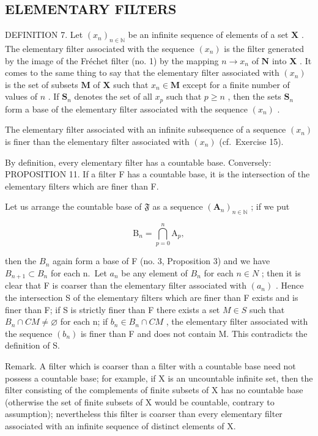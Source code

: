 \subsection{ELEMENTARY FILTERS}

DEFINITION 7. Let \((x_{n})_{n\in \mathbb{N}}\) be an infinite sequence of elements of a set \(\mathbf{X}\) . The elementary filter associated with the sequence \((x_{n})\) is the filter generated by the image of the Fréchet filter (no. 1) by the mapping \(n\to x_n\) of \(\mathbf{N}\) into \(\mathbf{X}\) . It comes to the same thing to say that the elementary filter associated with \((x_{n})\) is the set of subsets \(\mathbf{M}\) of \(\mathbf{X}\) such that \(x_{n}\in \mathbf{M}\) except for a finite number of values of \(n\) . If \(\mathbf{S}_n\) denotes the set of all \(x_{p}\) such that \(p\geqslant n\) , then the sets \(\mathbf{S}_n\) form a base of the elementary filter associated with the sequence \((x_{n})\) .

The elementary filter associated with an infinite subsequence of a sequence \((x_{n})\) is finer than the elementary filter associated with \((x_{n})\) (cf.~Exercise 15).

By definition, every elementary filter has a countable base. Conversely: PROPOSITION 11. If a filter F has a countable base, it is the intersection of the elementary filters which are finer than F.

Let us arrange the countable base of \(\mathfrak{F}\) as a sequence \((\mathbf{A}_n)_{n\in \mathbb{N}}\) ; if we put

\[
\mathrm{B} _ {n} = \bigcap_ {p = 0} ^ {n} \mathrm{A} _ {p},
\]

then the \(B_{n}\) again form a base of F (no. 3, Proposition 3) and we have \(B_{n+1} \subset B_{n}\) for each n.~Let \(a_{n}\) be any element of \(B_{n}\) for each \(n \in N\) ; then it is clear that F is coarser than the elementary filter associated with \((a_{n})\) . Hence the intersection S of the elementary filters which are finer than F exists and is finer than F; if S is strictly finer than F there exists a set \(M \in S\) such that \(B_{n} \cap CM \neq \varnothing\) for each n; if \(b_{n} \in B_{n} \cap CM\) , the elementary filter associated with the sequence \((b_{n})\) is finer than F and does not contain M. This contradicts the definition of S.

Remark. A filter which is coarser than a filter with a countable base need not possess a countable base; for example, if X is an uncountable infinite set, then the filter consisting of the complements of finite subsets of X has no countable base (otherwise the set of finite subsets of X would be countable, contrary to assumption); nevertheless this filter is coarser than every elementary filter associated with an infinite sequence of distinct elements of X.


